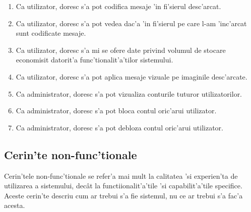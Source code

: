 \documentclass[12pt,a4paper,twoside]{report}
\begin{document}
\begin{enumerate}[label=CF\arabic*]
\item{Ca utilizator, doresc s'a pot codifica mesaje 'in fi'sierul desc'arcat.}
\item{Ca utilizator, doresc s'a pot vedea dac'a 'in fi'sierul pe care l-am 'inc'arcat sunt codificate  mesaje.}
\item{Ca utilizator, doresc s'a mi se ofere date privind volumul de stocare economisit datorit'a func'tionalit'a'tilor sistemului.}
\item{Ca utilizator, doresc s'a pot aplica mesaje vizuale pe imaginile desc'arcate.}
\item{Ca administrator, doresc s'a pot vizualiza conturile tuturor utilizatorilor.}
\item{Ca administrator, doresc s'a pot bloca contul oric'arui utilizator.}
\item{Ca administrator, doresc s'a pot debloza contul oric'arui utilizator.}
\end{enumerate}

\subsection{Cerin'te non-func'tionale}
Cerin'tele non-func'tionale se refer'a mai mult la calitatea 'si experien'ta de utilizarea a sistemului, decât la functiionalit'a'tile 'si capabilit'a'tile specifice. Aceste cerin'te descriu cum ar trebui s'a fie sistemul, nu ce ar trebui s'a fac'a acesta.
\end{document}
